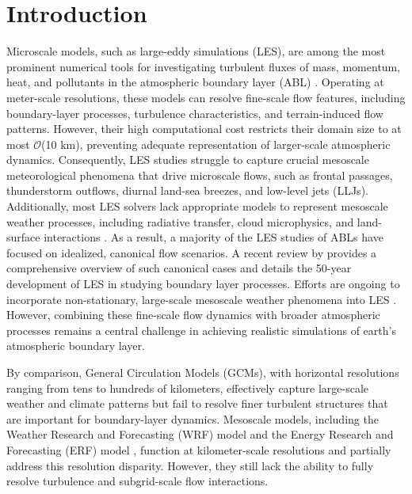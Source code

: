 \section{Introduction}
\label{sec:intro}
Microscale models, such as large-eddy simulations (LES), are among the most prominent numerical tools for investigating turbulent fluxes of mass, momentum, heat, and pollutants in the atmospheric boundary layer (ABL) \citep{stoll2020large}. Operating at meter-scale resolutions, these models can resolve fine-scale flow features, including boundary-layer processes, turbulence characteristics, and terrain-induced flow patterns. However, their high computational cost restricts their domain size to at most $\mathcal{O}$(10 km), preventing adequate representation of larger-scale atmospheric dynamics. Consequently, LES studies struggle to capture crucial mesoscale meteorological phenomena that drive microscale flows, such as frontal passages, thunderstorm outflows, diurnal land-sea breezes, and low-level jets (LLJs). Additionally, most LES solvers lack appropriate models to represent mesoscale weather processes, including radiative transfer, cloud microphysics, and land-surface interactions \citep{haupt2023lessons}. As a result, a majority of the LES studies of ABLs have focused on idealized, canonical flow scenarios. A recent review by \citet{stoll2020large} provides a comprehensive overview of such canonical cases and details the 50-year development of LES in studying boundary layer processes. Efforts are ongoing to incorporate non-stationary, large-scale mesoscale weather phenomena into LES \citep{Haupt2019, haupt2023lessons, sanz2017mesoscale}. However, combining these fine-scale flow dynamics with broader atmospheric processes remains a central challenge in achieving realistic simulations of earth's atmospheric boundary layer. 

By comparison, General Circulation Models (GCMs), with horizontal resolutions ranging from tens to hundreds of kilometers, effectively capture large-scale weather and climate patterns but fail to resolve finer turbulent structures that are important for boundary-layer dynamics. Mesoscale models, including the Weather Research and Forecasting (WRF) model \citep{michalakes2001, michalakes2005weather} and the Energy Research and Forecasting (ERF) model \citep{almgren2023erf}, function at kilometer-scale resolutions and partially address this resolution disparity. However, they still lack the ability to fully resolve turbulence and subgrid-scale flow interactions. 


